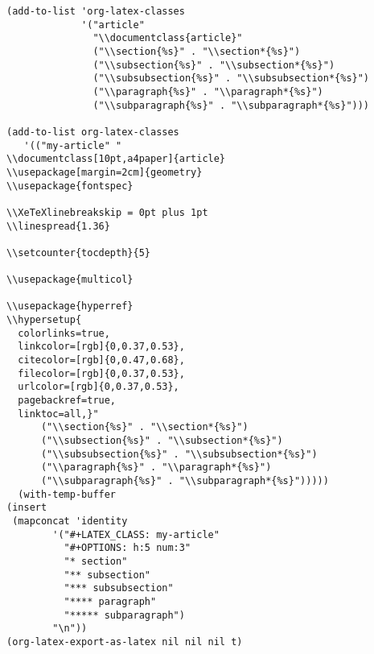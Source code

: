 \documentclass{article}
\begin{document}
\begin{verbatim}
(add-to-list 'org-latex-classes
             '("article"
               "\\documentclass{article}"
               ("\\section{%s}" . "\\section*{%s}")
               ("\\subsection{%s}" . "\\subsection*{%s}")
               ("\\subsubsection{%s}" . "\\subsubsection*{%s}")
               ("\\paragraph{%s}" . "\\paragraph*{%s}")
               ("\\subparagraph{%s}" . "\\subparagraph*{%s}")))

(add-to-list org-latex-classes
   '(("my-article" "
\\documentclass[10pt,a4paper]{article}
\\usepackage[margin=2cm]{geometry}
\\usepackage{fontspec}

\\XeTeXlinebreakskip = 0pt plus 1pt
\\linespread{1.36}

\\setcounter{tocdepth}{5}

\\usepackage{multicol}

\\usepackage{hyperref}
\\hypersetup{
  colorlinks=true,
  linkcolor=[rgb]{0,0.37,0.53},
  citecolor=[rgb]{0,0.47,0.68},
  filecolor=[rgb]{0,0.37,0.53},
  urlcolor=[rgb]{0,0.37,0.53},
  pagebackref=true,
  linktoc=all,}"
      ("\\section{%s}" . "\\section*{%s}")
      ("\\subsection{%s}" . "\\subsection*{%s}")
      ("\\subsubsection{%s}" . "\\subsubsection*{%s}")
      ("\\paragraph{%s}" . "\\paragraph*{%s}")
      ("\\subparagraph{%s}" . "\\subparagraph*{%s}")))))
  (with-temp-buffer
(insert
 (mapconcat 'identity
        '("#+LATEX_CLASS: my-article"
          "#+OPTIONS: h:5 num:3"
          "* section"
          "** subsection"
          "*** subsubsection"
          "**** paragraph"
          "***** subparagraph")
        "\n"))
(org-latex-export-as-latex nil nil nil t)
\end{verbatim}
\end{document}
